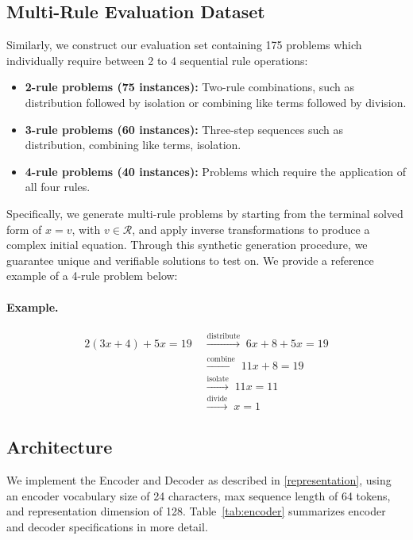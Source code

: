 \documentclass{article}
\begin{document}
\subsection{Multi-Rule Evaluation Dataset}

Similarly, we construct our evaluation set containing 175 problems which individually require between 2 to 4 sequential rule operations:
\begin{itemize}
\item \textbf{2-rule problems (75 instances):} Two-rule combinations, such as distribution followed by isolation or combining like terms followed by division.
\item \textbf{3-rule problems (60 instances):} Three-step sequences such as distribution, combining like terms, isolation.
\item \textbf{4-rule problems (40 instances):} Problems which require the application of all four rules.
\end{itemize}

Specifically, we generate multi-rule problems by starting from the terminal solved form of $x = v$, with $v \in \mathcal{R}$, and apply inverse transformations to produce a complex initial equation. Through this synthetic generation procedure, we guarantee unique and verifiable solutions to test on. We provide a reference example of a 4-rule problem below:

\paragraph{Example.}
\begin{align*}
2(3x + 4) + 5x = 19
&\;\xrightarrow{\text{distribute}}\;
6x + 8 + 5x = 19 \\
&\;\xrightarrow{\text{combine}}\;
11x + 8 = 19 \\
&\;\xrightarrow{\text{isolate}}\;
11x = 11 \\
&\;\xrightarrow{\text{divide}}\;
x = 1
\end{align*}


\subsection{Architecture}

We implement the Encoder and Decoder as described in \ref{representation}, using an encoder vocabulary size of 24 characters, max sequence length of 64 tokens, and representation dimension of 128. Table~\ref{tab:encoder} summarizes encoder and decoder specifications in more detail. 
\end{document}
